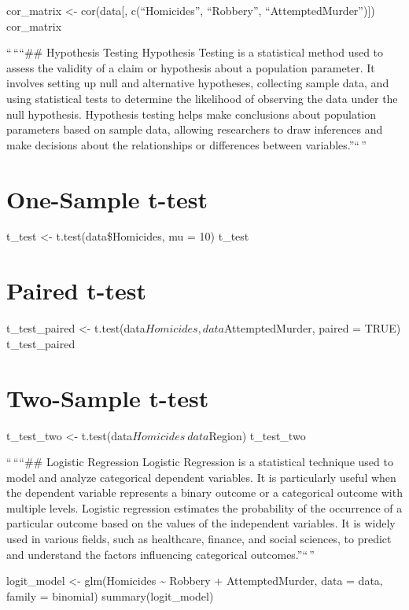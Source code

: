\documentclass[
]{article}
\begin{document}
cor\_matrix \textless- cor(data{[}, c(``Homicides'', ``Robbery'',
``AttemptedMurder''){]}) cor\_matrix

``\,````\#\# Hypothesis Testing Hypothesis Testing is a statistical
method used to assess the validity of a claim or hypothesis about a
population parameter. It involves setting up null and alternative
hypotheses, collecting sample data, and using statistical tests to
determine the likelihood of observing the data under the null
hypothesis. Hypothesis testing helps make conclusions about population
parameters based on sample data, allowing researchers to draw inferences
and make decisions about the relationships or differences between
variables.''``\,''

\hypertarget{one-sample-t-test}{%
\section{One-Sample t-test}\label{one-sample-t-test}}

t\_test \textless- t.test(data\$Homicides, mu = 10) t\_test

\hypertarget{paired-t-test}{%
\section{Paired t-test}\label{paired-t-test}}

t\_test\_paired \textless-
t.test(data\(Homicides, data\)AttemptedMurder, paired = TRUE)
t\_test\_paired

\hypertarget{two-sample-t-test}{%
\section{Two-Sample t-test}\label{two-sample-t-test}}

t\_test\_two \textless- t.test(data\(Homicides ~ data\)Region)
t\_test\_two

``\,````\#\# Logistic Regression Logistic Regression is a statistical
technique used to model and analyze categorical dependent variables. It
is particularly useful when the dependent variable represents a binary
outcome or a categorical outcome with multiple levels. Logistic
regression estimates the probability of the occurrence of a particular
outcome based on the values of the independent variables. It is widely
used in various fields, such as healthcare, finance, and social
sciences, to predict and understand the factors influencing categorical
outcomes.''``\,''

logit\_model \textless- glm(Homicides \textasciitilde{} Robbery +
AttemptedMurder, data = data, family = binomial) summary(logit\_model)
\end{document}
